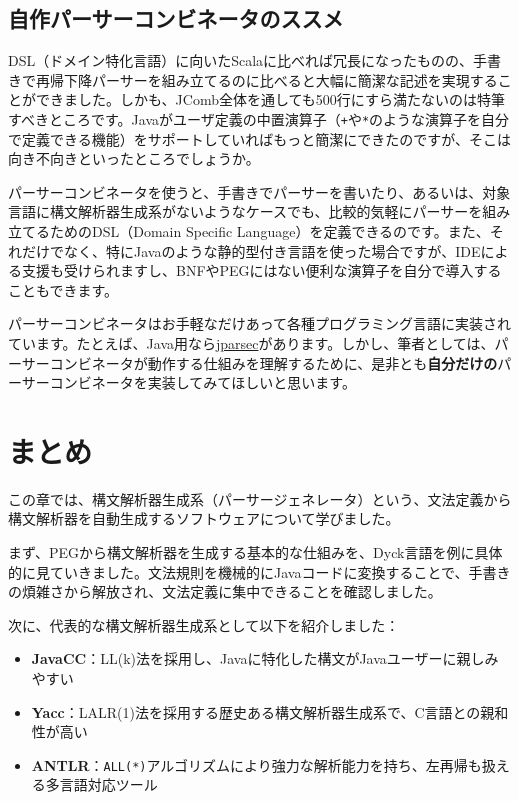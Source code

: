 \hypertarget{chapter6-ux81eaux4f5cux30d1ux30fcux30b5ux30fcux30b3ux30f3ux30d3ux30cdux30fcux30bfux306eux30b9ux30b9ux30e1}{%
\subsection{自作パーサーコンビネータのススメ}\label{chapter6-ux81eaux4f5cux30d1ux30fcux30b5ux30fcux30b3ux30f3ux30d3ux30cdux30fcux30bfux306eux30b9ux30b9ux30e1}}

DSL（ドメイン特化言語）に向いたScalaに比べれば冗長になったものの、手書きで再帰下降パーサーを組み立てるのに比べると大幅に簡潔な記述を実現することができました。しかも、JComb全体を通しても500行にすら満たないのは特筆すべきところです。Javaがユーザ定義の中置演算子（\texttt{+}や\texttt{*}のような演算子を自分で定義できる機能）をサポートしていればもっと簡潔にできたのですが、そこは向き不向きといったところでしょうか。

パーサーコンビネータを使うと、手書きでパーサーを書いたり、あるいは、対象言語に構文解析器生成系がないようなケースでも、比較的気軽にパーサーを組み立てるためのDSL（Domain
Specific
Language）を定義できるのです。また、それだけでなく、特にJavaのような静的型付き言語を使った場合ですが、IDEによる支援も受けられますし、BNFやPEGにはない便利な演算子を自分で導入することもできます。

パーサーコンビネータはお手軽なだけあって各種プログラミング言語に実装されています。たとえば、Java用なら\href{https://github.com/jparsec/jparsec}{jparsec}があります。しかし、筆者としては、パーサーコンビネータが動作する仕組みを理解するために、是非とも\textbf{自分だけの}パーサーコンビネータを実装してみてほしいと思います。

\hypertarget{chapter6-ux307eux3068ux3081}{%
\section{まとめ}\label{chapter6-ux307eux3068ux3081}}

この章では、構文解析器生成系（パーサージェネレータ）という、文法定義から構文解析器を自動生成するソフトウェアについて学びました。

まず、PEGから構文解析器を生成する基本的な仕組みを、Dyck言語を例に具体的に見ていきました。文法規則を機械的にJavaコードに変換することで、手書きの煩雑さから解放され、文法定義に集中できることを確認しました。

次に、代表的な構文解析器生成系として以下を紹介しました：

\begin{itemize}
\tightlist
\item
  \textbf{JavaCC}：LL(k)法を採用し、Javaに特化した構文がJavaユーザーに親しみやすい
\item
  \textbf{Yacc}：LALR(1)法を採用する歴史ある構文解析器生成系で、C言語との親和性が高い
\item
  \textbf{ANTLR}：\texttt{ALL(*)}アルゴリズムにより強力な解析能力を持ち、左再帰も扱える多言語対応ツール
\end{itemize}

